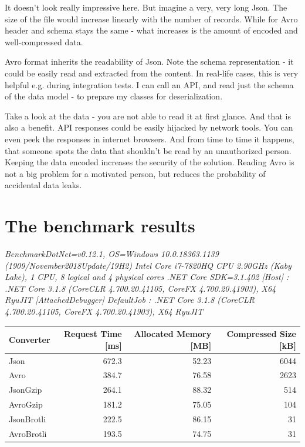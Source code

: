 \documentclass[]{article}
\begin{document}
It doesn't look really impressive here. But imagine a very, very long Json. The size of the file would increase linearly with the number of records. While for Avro header and schema stays the same - what increases is the amount of encoded and well-compressed data.

Avro format inherits the readability of Json. Note the schema representation - it could be easily read and extracted from the content. In real-life cases, this is very helpful e.g. during integration tests. I can call an API, and read just the schema of the data model - to prepare my classes for deserialization.

Take a look at the data - you are not able to read it at first glance. And that is also a benefit. API responses could be easily hijacked by network tools. You can even peek the responses in internet browsers. And from time to time it happens, that someone spots the data that shouldn't be read by an unauthorized person. Keeping the data encoded increases the security of the solution. Reading Avro is not a big problem for a motivated person, but reduces the probability of accidental data leaks.



\section{The benchmark results}


\emph{
BenchmarkDotNet=v0.12.1, OS=Windows 10.0.18363.1139 (1909/November2018Update/19H2)
Intel Core i7-7820HQ CPU 2.90GHz (Kaby Lake), 1 CPU, 8 logical and 4 physical cores
.NET Core SDK=3.1.402
  [Host]     : .NET Core 3.1.8 (CoreCLR 4.700.20.41105, CoreFX 4.700.20.41903), X64 RyuJIT  [AttachedDebugger]
  DefaultJob : .NET Core 3.1.8 (CoreCLR 4.700.20.41105, CoreFX 4.700.20.41903), X64 RyuJIT
}

\begin{center}
 \begin{tabular}{||l r r r ||} 
 \hline
 Converter & Request Time [ms] & Allocated Memory [MB] & Compressed Size [kB] \\ [0.5ex] 
 \hline\hline
 Json &	672.3 &	52.23 &	6044 \\ 
 \hline
 Avro &	384.7 &	76.58 &	2623 \\
 \hline
 JsonGzip &	264.1 &	88.32 &	514 \\
 \hline
 AvroGzip  &	181.2  &	75.05  &	104 \\
 \hline
 JsonBrotli   &	222.5   &	86.15   &	31 \\ 
 \hline
  AvroBrotli   &	193.5	& 74.75 & 	31 \\ 
 \hline
\end{tabular}
\end{center}
\end{document}
